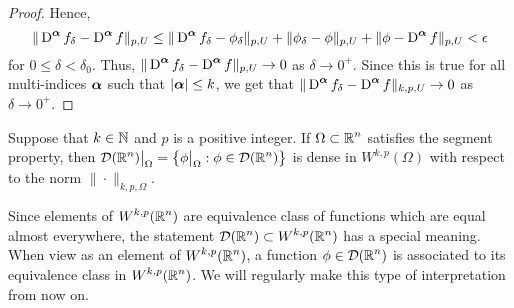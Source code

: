 \begin{proof}
Hence,
\[
\|\operatorname{D}^{{\bm{\alpha}}} f_\delta - \operatorname{D}^{{\bm{\alpha}}} f \|_{p,U} \leq
\|\operatorname{D}^{{\bm{\alpha}}} f_\delta - \phi_\delta \|_{p,U}
+ \| \phi_\delta - \phi\|_{p,U} 
+ \| \phi - \operatorname{D}^{{\bm{\alpha}}} f\|_{p,U} < \epsilon
\]
for $0\leq \delta < \delta_0$.  Thus,
$\displaystyle \|\operatorname{D}^{{\bm{\alpha}}} f_\delta
- \operatorname{D}^{{\bm{\alpha}}} f \|_{p,U} \to 0$ as
$\delta \to 0^+$.  Since this is true for all multi-indices ${\bm{\alpha}}$ such
that $|{\bm{\alpha}}|\leq k$, we get that
$\displaystyle \|\operatorname{D}^{{\bm{\alpha}}} f_\delta
- \operatorname{D}^{{\bm{\alpha}}} f \|_{k,p,U} \to 0$ as $\delta \to 0^+$.
\end{proof}

\begin{theorem} \label{DDRRnDWkp}
Suppose that $k\in \mathbb{N}$ and $p$ is a positive integer.
If $\displaystyle \Omega \subset \mathbb{R}^n$ satisfies the segment property, then 
$\displaystyle \mathcal{D}(\mathbb{R}^n)\big|_{\Omega} =
\left\{ \phi\big|_{\Omega} : \phi \in \mathcal{D}(\mathbb{R}^n) \right\}$
is dense in $\displaystyle W^{k,p}(\Omega)$ with respect to the norm
$\|\cdot\|_{k,p,\Omega}$.
\end{theorem}

\begin{rmk}
Since elements of $\displaystyle W^{k,p}(\mathbb{R}^n)$ are equivalence class
of functions which are equal almost everywhere, the statement
$\displaystyle \mathcal{D}(\mathbb{R}^n) \subset W^{k,p}(\mathbb{R}^n)$ has a special meaning.
When view as an element of $\displaystyle W^{k,p}(\mathbb{R}^n)$, 
a function $\displaystyle \phi \in \mathcal{D}(\mathbb{R}^n)$ is associated to its
equivalence class in $\displaystyle W^{k,p}(\mathbb{R}^n)$.  We will regularly make
this type of interpretation from now on.
\end{rmk}

